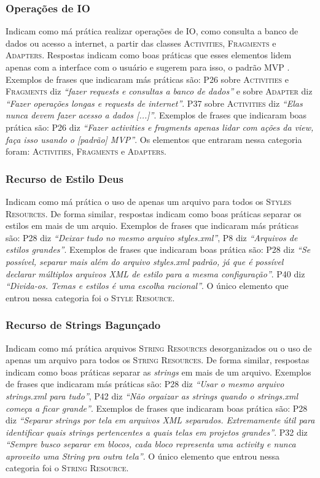 \subsubsection{Operações de IO}
Indicam como má prática realizar operações de IO, como consulta a banco de dados ou acesso a internet, a partir das classes \textsc{Activities}, \textsc{Fragments} e \textsc{Adapters}. Respostas indicam como boas práticas que esses elementos lidem apenas com a interface com o usuário e sugerem para isso, o padrão MVP \cite{WikipediaMVP, MartinFowlerGUIArchitectures}. Exemplos de frases que indicaram más práticas são: P26 sobre \textsc{Activities} e \textsc{Fragments} diz \textit{``fazer requests e consultas a banco de dados''} e sobre \textsc{Adapter} diz \textit{``Fazer operações longas e requests de internet''}. P37 sobre \textsc{Activities} diz \textit{``Elas nunca devem fazer acesso a dados [...]''}. Exemplos de frases que indicaram boas prática são: P26 diz \textit{``Fazer activities e fragments apenas lidar com ações da view, faça isso usando o [padrão] MVP''}. Os elementos que entraram nessa categoria foram: \textsc{Activities}, \textsc{Fragments} e \textsc{Adapters}. 

\subsubsection{Recurso de Estilo Deus}
Indicam como má prática o uso de apenas um arquivo para todos os \textsc{Styles Resources}. De forma similar, respostas indicam como boas práticas separar os estilos em mais de um arquio. Exemplos de frases que indicaram más práticas são: P28 diz \textit{``Deixar tudo no mesmo arquivo styles.xml''}, P8 diz \textit{``Arquivos de estilos grandes''}. Exemplos de frases que indicaram boas prática são: P28 diz \textit{``Se possível, separar mais além do arquivo styles.xml padrão, já que é possível declarar múltiplos arquivos XML de estilo para a mesma configuração''}. P40 diz \textit{``Divida-os. Temas e estilos é uma escolha racional''}. O único elemento que entrou nessa categoria foi o \textsc{Style Resource}. 

\subsubsection{Recurso de Strings Bagunçado}
Indicam como má prática arquivos \textsc{String Resources} desorganizados ou o uso de apenas um arquivo para todos os \textsc{String Resources}. De forma similar, respostas indicam como boas práticas separar as \textit{strings} em mais de um arquivo. Exemplos de frases que indicaram más práticas são: P28 diz \textit{``Usar o mesmo arquivo strings.xml para tudo''}, P42 diz \textit{``Não orgaizar as strings quando o strings.xml começa a ficar grande''}. Exemplos de frases que indicaram boas prática são: P28 diz \textit{``Separar strings por tela em arquivos XML separados. Extremamente útil para identificar quais strings pertencentes a quais telas em projetos grandes''}. P32 diz \textit{``Sempre busco separar em blocos, cada bloco representa uma activity e nunca aproveito uma String pra outra tela''}. O único elemento que entrou nessa categoria foi o \textsc{String Resource}. 


